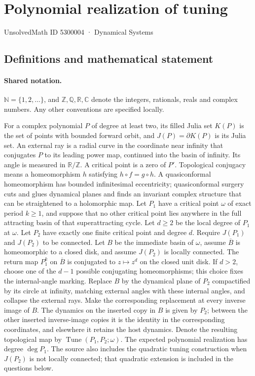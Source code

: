 \documentclass[11pt]{article}
\begin{document}
\setcounter{section}{5300003}
\section{Polynomial realization of tuning}\label{5300004}
{\small\sffamily UnsolvedMath ID 5300004 · Dynamical Systems}
\subsection{Definitions and mathematical statement}

\paragraph{Shared notation.}$\mathbb N=\{1,2,\ldots\}$, and $\mathbb Z,\mathbb Q,\mathbb R,\mathbb C$ denote the integers, rationals, reals and complex numbers. Any other conventions are specified locally.


For a complex polynomial $P$ of degree at least two, its filled Julia set $K(P)$ is the set of points with bounded forward orbit, and $J(P)=\partial K(P)$ is its Julia set. An external ray is a radial curve in the coordinate near infinity that conjugates $P$ to its leading power map, continued into the basin of infinity. Its angle is measured in $\mathbb R/\mathbb Z$. A critical point is a zero of $P'$. Topological conjugacy means a homeomorphism $h$ satisfying $h\circ f=g\circ h$. A quasiconformal homeomorphism has bounded infinitesimal eccentricity; quasiconformal surgery cuts and glues dynamical planes and finds an invariant complex structure that can be straightened to a holomorphic map.
Let $P_1$ have a critical point $\omega$ of exact period $k\geq1$, and suppose that no other critical point lies anywhere in the full attracting basin of that superattracting cycle. Let $d\geq2$ be the local degree of $P_1$ at $\omega$. Let $P_2$ have exactly one finite critical point and degree $d$. Require $J(P_1)$ and $J(P_2)$ to be connected. Let $B$ be the immediate basin of $\omega$, assume $\overline B$ is homeomorphic to a closed disk, and assume $J(P_2)$ is locally connected. The return map $P_1^k$ on $\overline B$ is conjugated to $z\mapsto z^d$ on the closed unit disk. If $d>2$, choose one of the $d-1$ possible conjugating homeomorphisms; this choice fixes the internal-angle marking.
Replace $B$ by the dynamical plane of $P_2$ compactified by its circle at infinity, matching external angles with these internal angles, and collapse the external rays. Make the corresponding replacement at every inverse image of $B$. The dynamics on the inserted copy in $B$ is given by $P_2$; between the other inserted inverse-image copies it is the identity in the corresponding coordinates, and elsewhere it retains the host dynamics. Denote the resulting topological map by $\operatorname{Tune}(P_1,P_2;\omega)$. The expected polynomial realization has degree $\deg P_1$. The source also includes the quadratic tuning construction when $J(P_2)$ is not locally connected; that quadratic extension is included in the questions below.
\end{document}
